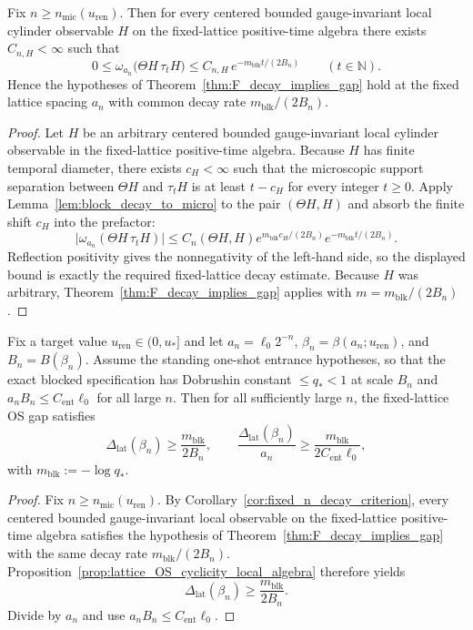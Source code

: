 \begin{corollary}\label{cor:fixed_n_decay_criterion}
Fix $n\ge n_{\mathrm{mic}}(u_{\mathrm{ren}})$.
Then for every centered bounded gauge-invariant local cylinder observable $H$ on the fixed-lattice positive-time algebra there exists $C_{n,H}<\infty$ such that
\[
0\le \omega_{a_n}\bigl(\Theta H\,\tau_t H\bigr)\le C_{n,H}\,e^{-m_{\mathrm{blk}}t/(2B_n)}
\qquad (t\in\mathbb N).
\]
Hence the hypotheses of Theorem~\ref{thm:F_decay_implies_gap} hold at the fixed lattice spacing $a_n$ with common decay rate $m_{\mathrm{blk}}/(2B_n)$.
\end{corollary}

\begin{proof}
Let $H$ be an arbitrary centered bounded gauge-invariant local cylinder observable in the fixed-lattice positive-time algebra.
Because $H$ has finite temporal diameter, there exists $c_H<\infty$ such that the microscopic support separation between $\Theta H$ and $\tau_t H$ is at least $t-c_H$ for every integer $t\ge 0$.
Apply Lemma~\ref{lem:block_decay_to_micro} to the pair $(\Theta H,H)$ and absorb the finite shift $c_H$ into the prefactor:
\[
\big|\omega_{a_n}(\Theta H\,\tau_t H)\big|
\le C_n(\Theta H,H)e^{m_{\mathrm{blk}}c_H/(2B_n)}e^{-m_{\mathrm{blk}}t/(2B_n)}.
\]
Reflection positivity gives the nonnegativity of the left-hand side, so the displayed bound is exactly the required fixed-lattice decay estimate.
Because $H$ was arbitrary, Theorem~\ref{thm:F_decay_implies_gap} applies with $m=m_{\mathrm{blk}}/(2B_n)$.
\end{proof}

\begin{corollary}\label{cor:uniform_phys_gap_from_bounded_entrance}
Fix a target value $u_{\mathrm{ren}}\in(0,u_\ast]$ and let $a_n=\ell_0 2^{-n}$, $\beta_n=\beta(a_n;u_{\mathrm{ren}})$, and $B_n=B(\beta_n)$.
Assume the standing one-shot entrance hypotheses, so that the exact blocked specification has Dobrushin constant $\le q_\ast<1$ at scale $B_n$ and $a_n B_n\le C_{\mathrm{ent}}\ell_0$ for all large $n$.
Then for all sufficiently large $n$, the fixed-lattice OS gap satisfies
\[
\Delta_{\mathrm{lat}}(\beta_n)\ge \frac{m_{\mathrm{blk}}}{2B_n},
\qquad
\frac{\Delta_{\mathrm{lat}}(\beta_n)}{a_n}\ge \frac{m_{\mathrm{blk}}}{2C_{\mathrm{ent}}\ell_0},
\]
with $m_{\mathrm{blk}}:=-\log q_\ast$.
\end{corollary}

\begin{proof}
Fix $n\ge n_{\mathrm{mic}}(u_{\mathrm{ren}})$.
By Corollary~\ref{cor:fixed_n_decay_criterion}, every centered bounded gauge-invariant local observable on the fixed-lattice positive-time algebra satisfies the hypothesis of Theorem~\ref{thm:F_decay_implies_gap} with the same decay rate $m_{\mathrm{blk}}/(2B_n)$.
Proposition~\ref{prop:lattice_OS_cyclicity_local_algebra} therefore yields
\[
\Delta_{\mathrm{lat}}(\beta_n)\ge \frac{m_{\mathrm{blk}}}{2B_n}.
\]
Divide by $a_n$ and use $a_nB_n\le C_{\mathrm{ent}}\ell_0$.
\end{proof}

